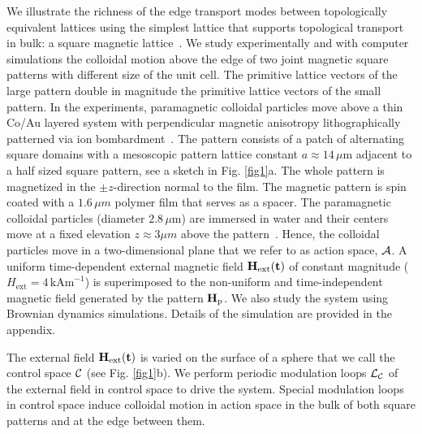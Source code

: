\documentclass[12pt]{iopart}
\begin{document}
We illustrate the richness of the edge transport modes between topologically equivalent lattices using the simplest lattice
that supports topological transport in bulk: a square magnetic lattice~\cite{tp2,tp3}. We study experimentally and 
with computer simulations the colloidal motion above the edge of two joint magnetic square patterns with different
size of the unit cell. The primitive lattice vectors of the large pattern double in magnitude the primitive lattice vectors of the small pattern.
In the experiments, paramagnetic colloidal particles move above a thin 
Co/Au layered system with perpendicular magnetic anisotropy 
lithographically patterned via ion bombardment~\cite{CBF1998,KET2010,tp3}. The pattern consists
of a patch of alternating square domains with a mesoscopic pattern lattice constant $a\approx 14\,\mu\textrm{m}$
adjacent to a half sized square pattern, see a sketch in Fig. \ref{fig1}a. The whole pattern is magnetized in the
$\pm z$-direction normal to the film. The magnetic pattern is spin coated with a $1.6\, \mu m$ polymer film that serves as a spacer. The paramagnetic colloidal particles (diameter
$2.8\,\mu\textrm{m}$) are immersed in water and their centers move
at a fixed elevation $z\approx 3\mu m$ above the pattern~\cite{tp3}.  Hence, the colloidal particles move in a two-dimensional
plane that we refer to as action space, $\cal A$. A uniform time-dependent
external magnetic field $\bf{H}_{\textrm{ext}}(t)$ of constant magnitude ($H_{\textrm{ext}}=4\,\textrm{kAm}^{-1}$)
is superimposed to the non-uniform and time-independent magnetic field generated by the pattern $\bf{H}_{\textrm{p}}$.
We also study the system using Brownian dynamics simulations. Details of the simulation are provided in the appendix.

The external field $\bf{H}_{\textrm{ext}}(t)$ is varied on the surface of a sphere that we call the
control space $\cal C$ (see Fig. \ref{fig1}b). We perform periodic modulation loops $\cal L_C$ of the external field in control space
to drive the system. Special modulation loops in control space induce colloidal motion in action space in the bulk of both square patterns
and at the edge between them.
\end{document}

